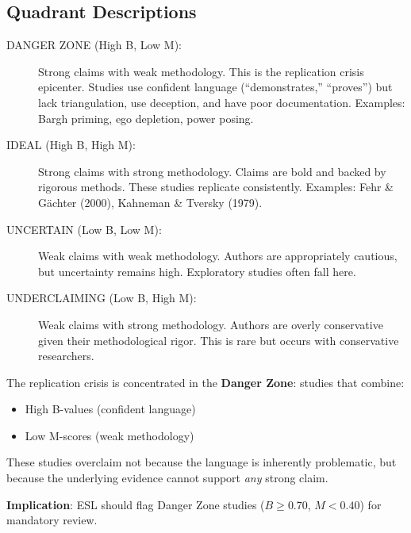 \documentclass[11pt,a4paper]{article}
\begin{document}
\subsection{Quadrant Descriptions}

\begin{description}
    \item[DANGER ZONE (High B, Low M):] Strong claims with weak methodology. This is the replication crisis epicenter. Studies use confident language (``demonstrates,'' ``proves'') but lack triangulation, use deception, and have poor documentation. Examples: Bargh priming, ego depletion, power posing.

    \item[IDEAL (High B, High M):] Strong claims with strong methodology. Claims are bold and backed by rigorous methods. These studies replicate consistently. Examples: Fehr \& Gächter (2000), Kahneman \& Tversky (1979).

    \item[UNCERTAIN (Low B, Low M):] Weak claims with weak methodology. Authors are appropriately cautious, but uncertainty remains high. Exploratory studies often fall here.

    \item[UNDERCLAIMING (Low B, High M):] Weak claims with strong methodology. Authors are overly conservative given their methodological rigor. This is rare but occurs with conservative researchers.
\end{description}

\begin{dangerbox}[title={The Danger Zone Pattern}]
The replication crisis is concentrated in the \textbf{Danger Zone}: studies that combine:
\begin{itemize}
    \item High B-values (confident language)
    \item Low M-scores (weak methodology)
\end{itemize}

These studies overclaim not because the language is inherently problematic, but because the underlying evidence cannot support \textit{any} strong claim.

\textbf{Implication}: ESL should flag Danger Zone studies ($B \geq 0.70$, $M < 0.40$) for mandatory review.
\end{dangerbox}

\end{document}
